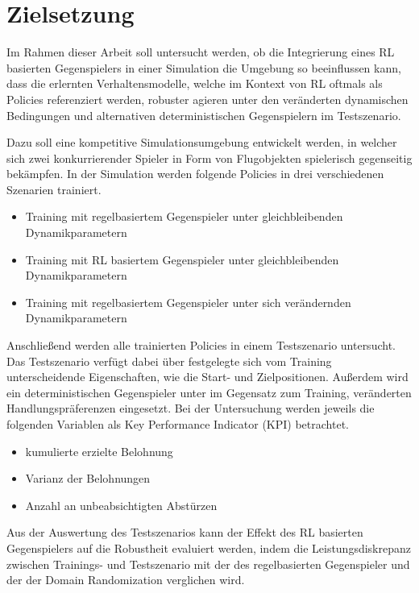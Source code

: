 \section{Zielsetzung}

Im Rahmen dieser Arbeit soll untersucht werden, ob die Integrierung eines RL basierten Gegenspielers in einer Simulation die Umgebung so beeinflussen kann, dass die erlernten Verhaltensmodelle, welche im Kontext von RL oftmals als Policies referenziert werden, robuster agieren unter den veränderten dynamischen Bedingungen und alternativen deterministischen Gegenspielern im Testszenario. 

Dazu soll eine kompetitive Simulationsumgebung entwickelt werden, in welcher sich zwei konkurrierender Spieler in Form von Flugobjekten spielerisch gegenseitig bekämpfen.
In der Simulation werden folgende Policies in drei verschiedenen Szenarien trainiert.

\begin{itemize}
    \item Training mit regelbasiertem Gegenspieler unter gleichbleibenden Dynamikparametern
    \item Training mit RL basiertem Gegenspieler unter gleichbleibenden Dynamikparametern
    \item Training mit regelbasiertem Gegenspieler unter sich verändernden Dynamikparametern
\end{itemize}

Anschließend werden alle trainierten Policies in einem Testszenario untersucht.
Das Testszenario verfügt dabei über festgelegte sich vom Training unterscheidende Eigenschaften, wie die Start- und Zielpositionen.
Außerdem wird ein deterministischen Gegenspieler unter im Gegensatz zum Training, veränderten Handlungspräferenzen eingesetzt.
Bei der Untersuchung werden jeweils die folgenden Variablen als Key Performance Indicator (KPI) betrachtet.
\begin{itemize}
    \item kumulierte erzielte Belohnung
    \item Varianz der Belohnungen
    \item Anzahl an unbeabsichtigten Abstürzen
\end{itemize}

Aus der Auswertung des Testszenarios kann der Effekt des RL basierten Gegenspielers auf die Robustheit evaluiert werden, indem die Leistungsdiskrepanz zwischen Trainings- und Testszenario mit der des regelbasierten Gegenspieler und der der Domain Randomization verglichen wird.


